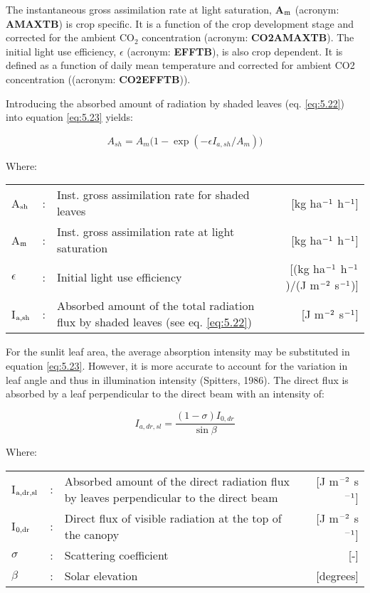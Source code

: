 The instantaneous gross assimilation rate at light saturation, {\bf A$_{{\rm m}}$} (acronym: {\bf AMAXTB}) is
crop specific. It is a function of the crop development stage and corrected for the ambient CO$_{2}$ 
concentration (acronym: {\bf CO2AMAXTB}). The initial light use efficiency, {\bf $\epsilon$}
(acronym: {\bf EFFTB}), is also crop dependent. It is defined as a function of daily mean temperature and
corrected for ambient CO2 concentration ((acronym: {\bf CO2EFFTB})). 

Introducing the absorbed amount of radiation by shaded leaves (eq. \ref{eq:5.22}) into 
equation \ref{eq:5.23} yields:

\begin{equation}
\label{eq:5.24}
A_{sh} = A_{m} \big(1-\exp({{-\epsilon I_{a,sh} }/{A_m}} ) \big)
\end{equation}

Where:\\[5pt]
\begin{tabularx}{\textwidth}{llXr}
	A$_{{\rm sh}}$ &:& Inst. gross assimilation rate for shaded leaves  & 
	[kg ha$^{{\rm -1}}$ h$^{{\rm -1}}$]\\
	A$_{{\rm m}}$ &:& Inst. gross assimilation rate at light saturation & 
	[kg ha$^{{\rm -1}}$ h$^{{\rm -1}}$]\\
	$\epsilon$ &:& Initial light use efficiency  &  
	[(kg ha$^{{\rm -1}}$ h$^{{\rm -1}}$)/(J m$^{{\rm -2}}$ s$^{{\rm -1}}$)]\\
	I$_{{\rm a,sh}}$ &:& Absorbed amount of the total radiation flux  by shaded leaves (see eq. \ref{eq:5.22})   &
	[J m$^{{\rm -2}}$ s$^{{\rm -1}}$]\\
\end{tabularx}

For the sunlit leaf area, the average absorption intensity may be substituted in equation
\ref{eq:5.23}. However, it is more accurate to account for the variation in leaf angle and thus in
illumination intensity (Spitters, 1986). The direct flux is absorbed by a leaf perpendicular
to the direct beam with an intensity of: 

\begin{equation}
\label{eq:5.25}
I_{a,dr,sl} = {\frac{(1-\sigma) I_{0,dr}}{\sin \beta }}
\end{equation}

Where:\\[5pt]
\begin{tabularx}{\textwidth}{llXr}
	I$_{{\rm a,dr,sl}}$ &:& Absorbed amount of the direct radiation flux by leaves
	perpendicular to the direct beam    &    [J m$^{{\rm -2}}$ s$^{{\rm -1}}$]\\
	I$_{{\rm 0,dr}}$ &:& Direct flux of visible radiation at the top of 
	the canopy &  [J m$^{{\rm -2}}$ s$^{{\rm -1}}$]\\
	$\sigma$ &:& Scattering coefficient  &[-]\\
	$\beta$ &:& Solar elevation   & [degrees]\\
\end{tabularx}

